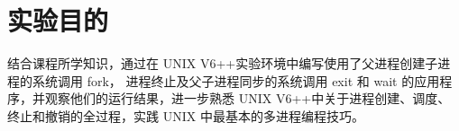 \section{实验目的}
结合课程所学知识，通过在 UNIX V6++实验环境中编写使用了父进程创建子进程的系统调用 fork，
进程终止及父子进程同步的系统调用 exit 和 wait 的应用程序，并观察他们的运行结果，进一步熟悉 UNIX
V6++中关于进程创建、调度、终止和撤销的全过程，实践 UNIX 中最基本的多进程编程技巧。
